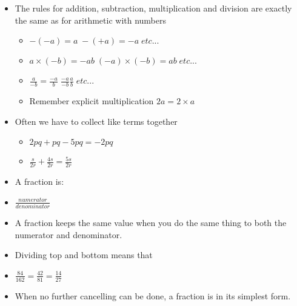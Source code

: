 \begin{frame}
\begin{itemize}
	\item The rules for addition, subtraction, multiplication and division are exactly the same as for arithmetic with numbers
	\begin{itemize}
		\item $-(-a) = a \; -(+a) = -a \; etc ...$
		\item $a \times(-b) = -ab \; (-a) \times (-b) = ab \; etc ...$
		\item $ \frac{a}{-b} = \frac{-a}{b} \; \frac{-a}{-b} \frac{a}{b} \; etc ...$
		\vspace*{.35cm}
		\item Remember explicit multiplication $2a = 2 \times a$
	\end{itemize}
	\end{itemize}
\end{frame}
\begin{frame}
\begin{itemize}
	\item Often we have to collect like terms together
	\begin{itemize}
		\item $2pq + pq - 5pq  =  -2pq$
		\item $\frac{s}{2r} + \frac{4s}{2r}  =  \frac{5s}{2r}$
	\end{itemize}
	\end{itemize}
\end{frame}


\begin{frame}
\begin{itemize}
	\item A fraction is:

	\item $ \frac{numerator}{denominator}$
	\item A fraction keeps the same value when you do the same thing to both the numerator and denominator.
	\item Dividing top and bottom means that
	\item $\frac{84}{162}  =  \frac{42}{81}  = \frac{14}{27}$
	\item When no further cancelling can be done, a fraction is in its simplest form.
	\end{itemize}
\end{frame}


